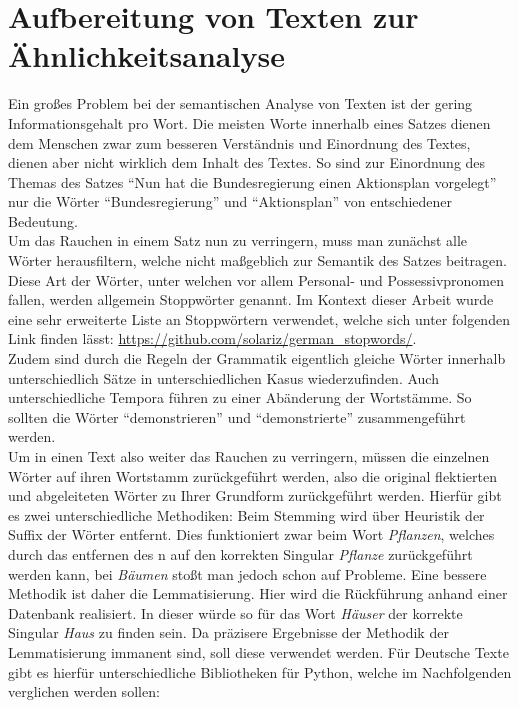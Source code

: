 \section{Aufbereitung von Texten zur Ähnlichkeitsanalyse}
Ein großes Problem bei der semantischen Analyse von Texten ist der gering Informationsgehalt pro Wort. Die meisten Worte innerhalb eines Satzes dienen dem Menschen zwar zum besseren Verständnis und Einordnung des Textes, dienen aber nicht wirklich dem Inhalt des Textes. So sind zur Einordnung des Themas des Satzes "`Nun hat die Bundesregierung einen Aktionsplan vorgelegt"' nur die Wörter "`Bundesregierung"' und "`Aktionsplan"' von entschiedener Bedeutung. \\ \newline
Um das Rauchen in einem Satz nun zu verringern, muss man zunächst alle Wörter herausfiltern, welche nicht maßgeblich zur Semantik des Satzes beitragen. Diese Art der Wörter, unter welchen vor allem Personal- und Possessivpronomen fallen, werden allgemein Stoppwörter genannt. Im Kontext dieser Arbeit wurde eine sehr erweiterte Liste an Stoppwörtern verwendet, welche sich unter folgenden Link finden lässt: \url{https://github.com/solariz/german_stopwords/}. \\ \newline
Zudem sind durch die Regeln der Grammatik eigentlich gleiche Wörter innerhalb unterschiedlich Sätze in unterschiedlichen Kasus wiederzufinden. Auch unterschiedliche Tempora führen zu einer Abänderung der Wortstämme. So sollten die Wörter "`demonstrieren"' und "`demonstrierte"' zusammengeführt werden. \\ \newline
Um in einen Text also weiter das Rauchen zu verringern, müssen die einzelnen Wörter auf ihren Wortstamm zurückgeführt werden, also die original flektierten und abgeleiteten Wörter zu Ihrer Grundform zurückgeführt werden. Hierfür gibt es zwei unterschiedliche Methodiken: Beim Stemming wird über Heuristik der Suffix der Wörter entfernt. Dies funktioniert zwar beim Wort \textit{Pflanzen}, welches durch das entfernen des n auf den korrekten Singular \textit{Pflanze} zurückgeführt werden kann, bei \textit{Bäumen} stoßt man jedoch schon auf Probleme. Eine bessere Methodik ist daher die Lemmatisierung. Hier wird die Rückführung anhand einer Datenbank realisiert. In dieser würde so für das Wort \textit{Häuser} der korrekte Singular \textit{Haus} zu finden sein. Da präzisere Ergebnisse der Methodik der Lemmatisierung immanent sind, soll diese verwendet werden. Für Deutsche Texte gibt es hierfür unterschiedliche Bibliotheken für Python, welche im Nachfolgenden verglichen werden sollen: \\ \newline

